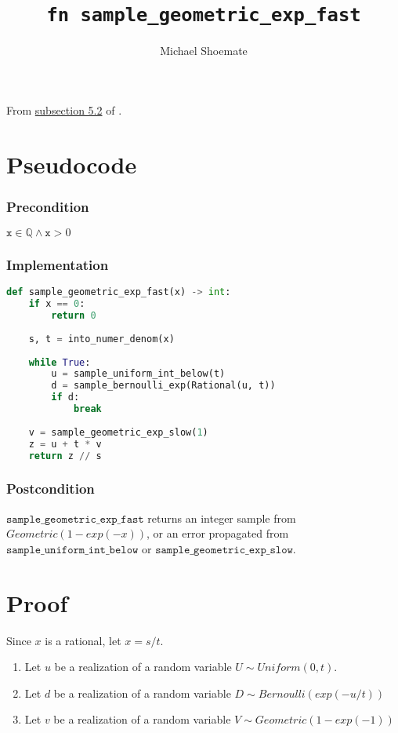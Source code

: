 \documentclass{article}
\title{\texttt{fn sample\_geometric\_exp\_fast}}
\author{Michael Shoemate}
\begin{document}
\maketitle

From \href{https://arxiv.org/pdf/2004.00010.pdf#subsection.5.2}{subsection 5.2} of \cite{CKS20}.

\section{Pseudocode}
\subsubsection*{Precondition}
$\texttt{x} \in \mathbb{Q} \land \texttt{x} > 0$

\subsubsection*{Implementation}        
\begin{lstlisting}[language=Python]
def sample_geometric_exp_fast(x) -> int:
    if x == 0:
        return 0
    
    s, t = into_numer_denom(x)
    
    while True:
        u = sample_uniform_int_below(t)
        d = sample_bernoulli_exp(Rational(u, t))
        if d:
            break
        
    v = sample_geometric_exp_slow(1)
    z = u + t * v
    return z // s
\end{lstlisting}

\subsubsection*{Postcondition}
$\texttt{sample\_geometric\_exp\_fast}$ returns an integer sample from $Geometric(1 - exp(-x))$, or an error propagated from $\texttt{sample\_uniform\_int\_below}$ or $\texttt{sample\_geometric\_exp\_slow}$.

\section{Proof}
Since $x$ is a rational, let $x = s/t$. 

\begin{enumerate}
    \item Let $u$ be a realization of a random variable $U \sim Uniform(0, t)$.
    \item Let $d$ be a realization of a random variable $D \sim Bernoulli(exp(-u/t))$
    \item Let $v$ be a realization of a random variable $V \sim Geometric(1 - exp(-1))$
\end{enumerate}
\end{document}
